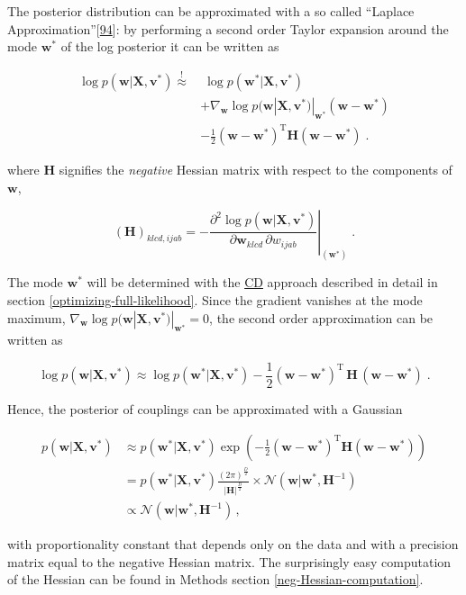 \documentclass[11pt,a4paper,twoside]{book}
\newcommand{\Gauss}{\mathcal{N}}
\renewcommand{\H}{\mathbf{H}}
\renewcommand{\v}{\mathbf{v}}
\newcommand{\w}{\mathbf{w}}
\newcommand{\wijab}{w_{ijab}}
\newcommand{\X}{\mathbf{X}}
\theoremstyle{definition}
\theoremstyle{definition}
\theoremstyle{remark}
\begin{document}
The posterior distribution can be approximated with a so called
``Laplace Approximation''{[}\protect\hyperlink{ref-Murphy2012}{94}{]}:
by performing a second order Taylor expansion around the mode \(\w^*\)
of the log posterior it can be written as

\begin{align}
    \log p(\w | \X , \v^*) \overset{!}{\approx} &  \;  \log p(\w^* | \X , \v^*) \nonumber\\
                & + \nabla_\w \log p(\w | \X , \v^*)|_{\w^*}(\w-\w^*) \nonumber\\ 
                & - \frac{1}{2} (\w-\w^*)^{\mathrm{T}} \H (\w-\w^*)  \; .
\end{align}

where \(\H\) signifies the \emph{negative} Hessian matrix with respect
to the components of \(\w\),

\begin{equation}
    (\H)_{klcd, ijab} = - \left. \frac{\partial^2  \log p(\w | \X , \v^{*})}{\partial \w_{klcd} \, \partial \wijab  } \right|_{(\w^{*})} \; .
\end{equation}

The mode \(\w^*\) will be determined with the
\protect\hyperlink{abbrev}{CD} approach described in detail in section
\ref{optimizing-full-likelihood}. Since the gradient vanishes at the
mode maximum, \(\nabla_\w \log p(\w | \X , \v^*)|_{\w^*} = 0\), the
second order approximation can be written as

\begin{equation}
    \log p(\w | \X , \v^*) {\approx}  \log p(\w^* | \X , \v^*)  - \frac{1}{2} (\w-\w^*)^{\mathrm{T}} \, \H \, (\w-\w^*)  \;.
\end{equation}

Hence, the posterior of couplings can be approximated with a Gaussian

\begin{align}
   p(\w | \X , \v^*) &\approx p(\w^* | \X , \v^*) \exp \left( - \frac{1}{2} (\w-\w^*)^{\mathrm{T}} \H  (\w -\w^*) \right) \nonumber \\
              &= p(\w^* | \X , \v^*) \frac{(2 \pi)^\frac{D}{2}} { |\H|^\frac{D}{2}} \times \Gauss (\w | \w^*, \H^{-1} ) \nonumber \\
              &\propto  \Gauss (\w | \w^*, \H^{-1}) \,,
\label{eq:reg-lik-gauss-approx}
\end{align}

with proportionality constant that depends only on the data and with a
precision matrix equal to the negative Hessian matrix. The surprisingly
easy computation of the Hessian can be found in Methods section
\ref{neg-Hessian-computation}.
\end{document}
